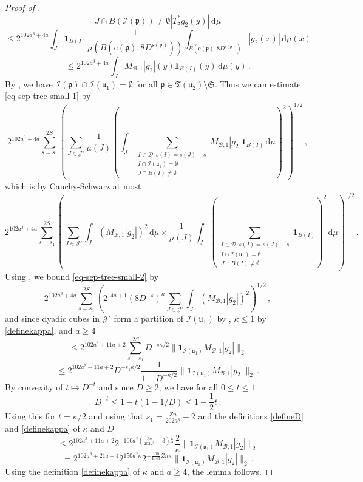 \documentclass[10pt,a4paper]{article}
\theoremstyle{plain}
\theoremstyle{definition}
\numberwithin{equation}{subsection}
\newcommand{\fp}{{\mathfrak p}}
\newcommand{\fu}{{\mathfrak u}}
\newcommand{\fT}{{\mathfrak T}}
\newcommand{\pc}{{\mathrm{c}}}
\newcommand{\ps}{{\mathrm{s}}}
\newcommand{\scI}{{\mathcal{I}}} %
\begin{document}
\begin{proof}[Proof of ]
$${{        J \cap B(\scI(\fp)) \ne \emptyset}} |T_{\fp}^* g_2(y)| \, \mathrm{d}\mu
    $$
    $$
        \le 2^{102a^3+4a} \int_J \mathbf{1}_{B(I)} \frac{1}{\mu(B(\pc(\fp), 8D^{\ps(\fp)}))} \int_{B(\pc(\fp), 8D^{\ps(\fp)})} |g_2(x)| \, \mathrm{d}\mu(x)
    $$
    $$
        \le 2^{102a^3+4a} \int_J M_{\mathcal{B},1} |g_2|(y) \mathbf{1}_{B(I)}(y) \, \mathrm{d}\mu(y)\,.
    $$
    By , we have $\scI(\fp) \cap \scI(\fu_1) = \emptyset$ for all $\fp \in \fT(\fu_2) \setminus \mathfrak{S}$.
    Thus we can estimate \eqref{eq-sep-tree-small-1} by
    $$
        2^{102a^3+4a} \sum_{s=s_1}^{2S} \left( \sum_{J \in \mathcal{J}'} \frac{1}{\mu(J)} \left(\int_J \sum_{\substack{I \in \mathcal{D}, s(I) = s(J) - s\\ I \cap \scI(\fu_1) = \emptyset\\
        J \cap B(I) \ne \emptyset}} M_{\mathcal{B},1} |g_2| \mathbf{1}_{B(I)} \, \mathrm{d}\mu \right)^2\right)^{1/2}\,,
    $$
    which is by Cauchy-Schwarz at most
    \begin{equation}
    \label{eq-sep-tree-small-2}
        2^{102a^3+4a} \sum_{s=s_1}^{2S} \left( \sum_{J \in \mathcal{J}'} \int_J ( M_{\mathcal{B},1} |g_2|)^2 \, \mathrm{d}\mu \times
        \frac{1}{\mu(J)} \int_J \left(\sum_{\substack{I \in \mathcal{D}, s(I) = s(J) - s\\ I \cap \scI(\fu_1) = \emptyset\\
        J \cap B(I) \ne \emptyset}} \mathbf{1}_{B(I)}\right)^2 \, \mathrm{d}\mu \right)^{1/2}\,.
    \end{equation}
    Using , we bound \eqref{eq-sep-tree-small-2} by
    $$
        2^{102a^3+4a} \sum_{s=s_1}^{2S} \left(2^{14a+1} (8 D^{-s})^\kappa \sum_{J \in \mathcal{J}'} \int_J (M_{\mathcal{B},1} |g_2|)^2\right)^{1/2}\,,
    $$
    and since dyadic cubes in $\mathcal{J}'$ form a partition of $\scI(\fu_1)$ by , $\kappa \le 1$ by \eqref{definekappa}, and $a \ge 4$
    $$
        \le 2^{102a^3+11a+2} \sum_{s=s_1}^{2S} D^{-s\kappa/2} \|\mathbf{1}_{\scI(\fu_1)} M_{\mathcal{B},1} |g_2|\|_2
    $$
    $$
        \le 2^{102a^3+11a+2} D^{-s_1 \kappa /2} \frac{1}{1 - D^{-\kappa/2}} \|\mathbf{1}_{\scI(\fu_1)} M_{\mathcal{B},1} |g_2|\|_2\,.
    $$
    By convexity of $t \mapsto D^{-t}$ and since $D \ge 2$, we have for all $0 \le t \le 1$
    $$
        D^{-t} \le 1 - t(1 - 1/D) \le 1 - \frac{1}{2}t\,.
    $$
    Using this for $t = \kappa/2$ and using that $s_1 = \frac{Zn}{202a^3} - 2$ and the definitions \eqref{defineD} and \eqref{definekappa} of $\kappa$ and $D$
    $$
        \le 2^{102a^3+11a+2} 2^{-100a^2(\frac{Zn}{202a^3} - 3) \frac{\kappa}{2}} \frac{2}{\kappa} \|\mathbf{1}_{\scI(\fu_1)} M_{\mathcal{B},1} |g_2|\|_2
    $$
    $$
        = 2^{102a^3+21a+4} 2^{150a^2\kappa} 2^{-\frac{100}{404a}Zn\kappa} \|\mathbf{1}_{\scI(\fu_1)} M_{\mathcal{B},1} |g_2|\|_2\,.
    $$
    Using the definition \eqref{definekappa} of $\kappa$ and $a \ge 4$, the lemma follows.
\end{proof}
\end{document}
